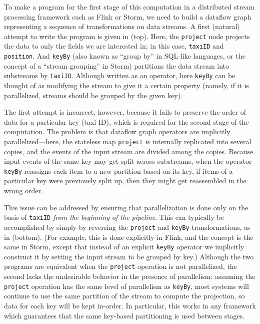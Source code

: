 To make a program for the first stage of this computation in a distributed stream processing framework such as Flink or Storm, we need to build a dataflow graph representing a sequence of transformations on data streams. A first (natural) attempt to write the program is given in  (top). Here, the \texttt{project} node projects the data to only the fields we are interested in; in this case, \texttt{taxiID} and \texttt{position}. And \texttt{keyBy} (also known as ``group by'' in SQL-like languages, or the concept of a ``stream grouping'' in Storm) partitions the data stream into substreams by \texttt{taxiID}.
Although written as an operator, here \texttt{keyBy} can be thought of as modifying the stream to give it a certain property (namely, if it is parallelized, streams should be grouped by the given key).

The first attempt is incorrect, however, because it fails to preserve
the order of data for a particular key (taxi ID), which is required
for the second stage of the computation. The problem is that dataflow
graph operators are implicitly parallelized---here, the stateless map
\texttt{project} is internally replicated into several copies, and the
events of the input stream are divided among the copies.
Because input events of the same key may get split across substreams,
when the operator \texttt{keyBy} reassigns each item to a new
partition based on its key, if items of a particular key were
previously split up, then they might get reassembled in the wrong
order.

This issue can be addressed by ensuring that parallelization is done only on the basis of \texttt{taxiID} \emph{from the beginning of the pipeline}.
This can typically be accomplished by simply by reversing the \texttt{project} and \texttt{keyBy} transformations, as in  (bottom).
(For example, this is done explicitly in Flink, and the concept is the same in Storm, except that instead of an explicit \texttt{keyBy} operator we implicitly construct it by setting the input stream to be grouped by key.)
Although the two programs are equivalent when the \texttt{project} operation is not parallelized, the second lacks the undesirable behavior in the presence of parallelism: assuming the \texttt{project} operation has the same level of parallelism as \texttt{keyBy}, most systems will continue to use the same partition of the stream to compute the projection, so data for each key will be kept in-order. In particular, this works in any framework which guarantees that the same key-based partitioning is used between stages.

